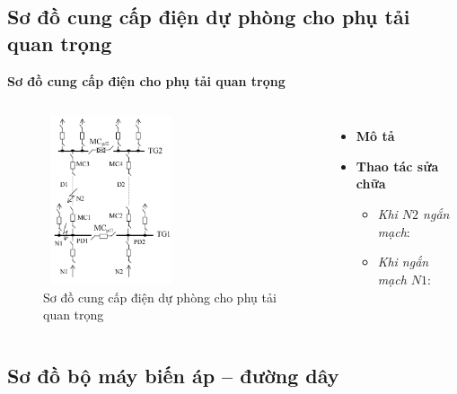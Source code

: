 \documentclass{beamer}
\begin{document}
\subsection{Sơ đồ cung cấp điện dự phòng cho phụ tải quan trọng}
\begin{frame}{\textbf{Sơ đồ cung cấp điện cho phụ tải quan trọng}}
\begin{columns}
\begin{figure}[h]
\includegraphics[width=4cm, height=5cm]{ccddp}
\caption{Sơ đồ cung cấp điện dự phòng cho phụ tải quan trọng}
\end{figure}

\begin{itemize}
\item \textbf{Mô tả}
\item  \textbf{Thao tác sửa chữa}
\begin{itemize}
\item<1-> \emph{Khi $N2$ ngắn mạch}: 
\item<1-> \emph{Khi ngắn mạch $N1$}: 
\end{itemize}
\end{itemize}
\end{columns}
\end{frame}

\subsection{Sơ đồ bộ máy biến áp -- đường dây}
\end{document}
